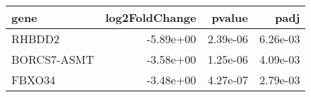 \begin{tabular}{lrrr}
\toprule
       gene &  log2FoldChange &   pvalue &     padj \\
\midrule
     RHBDD2 &       -5.89e+00 & 2.39e-06 & 6.26e-03 \\
BORCS7-ASMT &       -3.58e+00 & 1.25e-06 & 4.09e-03 \\
     FBXO34 &       -3.48e+00 & 4.27e-07 & 2.79e-03 \\
\bottomrule
\end{tabular}
